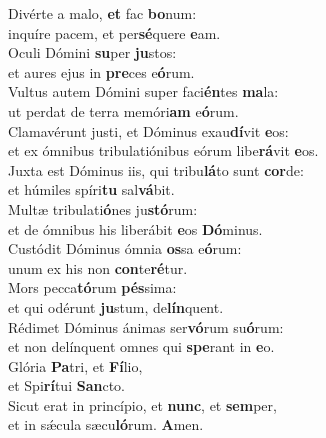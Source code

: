 \evenverse Divérte a malo, \textbf{et} fac \textbf{bo}num:~\*\\
\evenverse inquíre pacem, et per\textbf{sé}quere \textbf{e}am.\\
\oddverse Oculi Dómini \textbf{su}per \textbf{ju}stos:~\*\\
\oddverse et aures ejus in \textbf{pre}ces e\textbf{ó}rum.\\
\evenverse Vultus autem Dómini super faci\textbf{én}tes \textbf{ma}la:~\*\\
\evenverse ut perdat de terra memóri\textbf{am} e\textbf{ó}rum.\\
\oddverse Clamavérunt justi, et Dóminus exau\textbf{dí}vit \textbf{e}os:~\*\\
\oddverse et ex ómnibus tribulatiónibus eórum libe\textbf{rá}vit \textbf{e}os.\\
\evenverse Juxta est Dóminus iis, qui tribu\textbf{lá}to sunt \textbf{cor}de:~\*\\
\evenverse et húmiles spíri\textbf{tu} sal\textbf{vá}bit.\\
\oddverse Multæ tribulati\textbf{ó}nes ju\textbf{stó}rum:~\*\\
\oddverse et de ómnibus his liberábit \textbf{e}os \textbf{Dó}minus.\\
\evenverse Custódit Dóminus ómnia \textbf{os}sa e\textbf{ó}rum:~\*\\
\evenverse unum ex his non \textbf{con}te\textbf{ré}tur.\\
\oddverse Mors pecca\textbf{tó}rum \textbf{pés}sima:~\*\\
\oddverse et qui odérunt \textbf{ju}stum, de\textbf{lín}quent.\\
\evenverse Rédimet Dóminus ánimas ser\textbf{vó}rum su\textbf{ó}rum:~\*\\
\evenverse et non delínquent omnes qui \textbf{spe}rant in \textbf{e}o.\\
\oddverse Glória \textbf{Pa}tri, et \textbf{Fí}lio,~\*\\
\oddverse et Spi\textbf{rí}tui \textbf{San}cto.\\
\evenverse Sicut erat in princípio, et \textbf{nunc}, et \textbf{sem}per,~\*\\
\evenverse et in sǽcula sæcu\textbf{ló}rum. \textbf{A}men.\\
